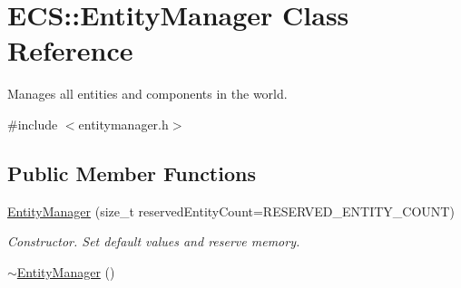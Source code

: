 \hypertarget{class_e_c_s_1_1_entity_manager}{\section{E\-C\-S\-:\-:Entity\-Manager Class Reference}
\label{class_e_c_s_1_1_entity_manager}
}


Manages all entities and components in the world.  




{\ttfamily \#include $<$entitymanager.\-h$>$}

\subsection*{Public Member Functions}
\begin{DoxyCompactItemize}
\item 
\hyperlink{class_e_c_s_1_1_entity_manager_a2b65211b0059901010486bcbedd84b96}{Entity\-Manager} (size\-\_\-t reserved\-Entity\-Count=R\-E\-S\-E\-R\-V\-E\-D\-\_\-\-E\-N\-T\-I\-T\-Y\-\_\-\-C\-O\-U\-N\-T)
\begin{DoxyCompactList}\small\item\em Constructor. Set default values and reserve memory. \end{DoxyCompactList}\item 
\hypertarget{class_e_c_s_1_1_entity_manager_a15d437a2a93cd3fc54eb1172848be95c}{\hyperlink{class_e_c_s_1_1_entity_manager_a15d437a2a93cd3fc54eb1172848be95c}{$\sim$\-Entity\-Manager} ()}\label{class_e_c_s_1_1_entity_manager_a15d437a2a93cd3fc54eb1172848be95c}


\end{DoxyCompactItemize}
